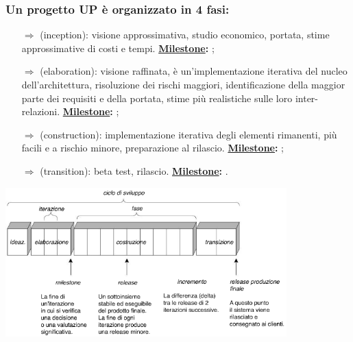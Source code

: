 \subsubsection{Un progetto UP è organizzato in 4 fasi:}

\begin{itemize}
    \item [$\Rightarrow$]  (inception): visione approssimativa, studio economico, portata, stime approssimative di costi e tempi. \textbf{\underline{Milestone}:} ;
    \item [$\Rightarrow$]  (elaboration): visione raffinata, è un'implementazione iterativa del nucleo dell'architettura, risoluzione dei rischi maggiori, identificazione della maggior parte dei requisiti e della portata, stime più realistiche sulle loro inter-relazioni. \textbf{\underline{Milestone}:} ;  
    \item [$\Rightarrow$]  (construction): implementazione iterativa degli elementi rimanenti, più facili e a rischio minore, preparazione al rilascio. \textbf{\underline{Milestone}:} ;
    \item [$\Rightarrow$]  (transition): beta test, rilascio. \textbf{\underline{Milestone}:} .
\end{itemize}

\begin{center}
    \includegraphics[scale = 1]{images/UP.png}
\end{center}



